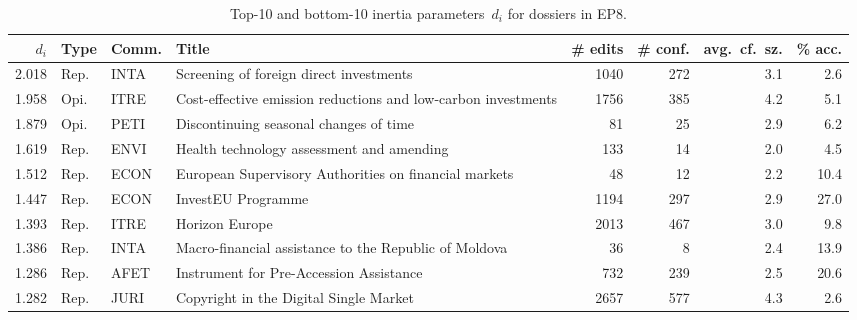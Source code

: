 \begin{sidewaystable}
	\centering
	\caption{Top-10 and bottom-10 inertia parameters~$d_i$ for dossiers in EP8.}
	\label{lmp:tab:inertia_params}
	\begin{tabular}{rlllrrrr}
		\toprule
		$d_i$  & Type & Comm. & Title                                                         & \# edits & \# conf. & avg.\ cf.\ sz. & \% acc. \\
		\midrule

		2.018  & Rep. & INTA  & Screening of foreign direct investments                       & 1040     & 272      & 3.1            & 2.6     \\
		1.958  & Opi. & ITRE  & Cost-effective emission reductions and low-carbon investments & 1756     & 385      & 4.2            & 5.1     \\
		1.879  & Opi. & PETI  & Discontinuing seasonal changes of time                        & 81       & 25       & 2.9            & 6.2     \\
		1.619  & Rep. & ENVI  & Health technology assessment and amending                     & 133      & 14       & 2.0            & 4.5     \\
		1.512  & Rep. & ECON  & European Supervisory Authorities on financial markets         & 48       & 12       & 2.2            & 10.4    \\
		1.447  & Rep. & ECON  & InvestEU Programme                                            & 1194     & 297      & 2.9            & 27.0    \\
		1.393  & Rep. & ITRE  & Horizon Europe                                                & 2013     & 467      & 3.0            & 9.8     \\
		1.386  & Rep. & INTA  & Macro-financial assistance to the Republic of Moldova         & 36       & 8        & 2.4            & 13.9    \\
		1.286  & Rep. & AFET  & Instrument for Pre-Accession Assistance                       & 732      & 239      & 2.5            & 20.6    \\
		1.282  & Rep. & JURI  & Copyright in the Digital Single Market                        & 2657     & 577      & 4.3            & 2.6     \\

		\midrule


\end{tabular}
\end{sidewaystable}
